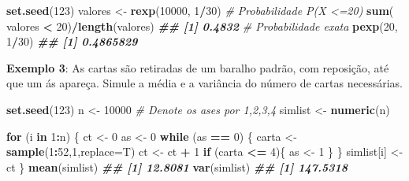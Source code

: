 \documentclass[
]{book}
\newenvironment{Shaded}{\begin{snugshade}}{\end{snugshade}}
\newcommand{\AttributeTok}[1]{\textcolor[rgb]{0.13,0.29,0.53}{#1}}
\newcommand{\CommentTok}[1]{\textcolor[rgb]{0.56,0.35,0.01}{\textit{#1}}}
\newcommand{\ControlFlowTok}[1]{\textcolor[rgb]{0.13,0.29,0.53}{\textbf{#1}}}
\newcommand{\DecValTok}[1]{\textcolor[rgb]{0.00,0.00,0.81}{#1}}
\newcommand{\DocumentationTok}[1]{\textcolor[rgb]{0.56,0.35,0.01}{\textbf{\textit{#1}}}}
\newcommand{\FunctionTok}[1]{\textcolor[rgb]{0.13,0.29,0.53}{\textbf{#1}}}
\newcommand{\NormalTok}[1]{#1}
\newcommand{\OtherTok}[1]{\textcolor[rgb]{0.56,0.35,0.01}{#1}}
\newcommand{\SpecialCharTok}[1]{\textcolor[rgb]{0.81,0.36,0.00}{\textbf{#1}}}
\begin{document}
\begin{Shaded}
\begin{Highlighting}[]
\FunctionTok{set.seed}\NormalTok{(}\DecValTok{123}\NormalTok{)}
\NormalTok{valores }\OtherTok{\textless{}{-}} \FunctionTok{rexp}\NormalTok{(}\DecValTok{10000}\NormalTok{, }\DecValTok{1}\SpecialCharTok{/}\DecValTok{30}\NormalTok{)}
\CommentTok{\# Probabilidade P(X \textless{}=20)}
\FunctionTok{sum}\NormalTok{( valores }\SpecialCharTok{\textless{}} \DecValTok{20}\NormalTok{)}\SpecialCharTok{/}\FunctionTok{length}\NormalTok{(valores)}
\DocumentationTok{\#\# [1] 0.4832}
\CommentTok{\# Probabilidade exata}
\FunctionTok{pexp}\NormalTok{(}\DecValTok{20}\NormalTok{, }\DecValTok{1}\SpecialCharTok{/}\DecValTok{30}\NormalTok{)}
\DocumentationTok{\#\# [1] 0.4865829}
\end{Highlighting}
\end{Shaded}

\textbf{Exemplo 3}: As cartas são retiradas de um baralho padrão, com
reposição, até que um ás apareça. Simule a média e a variância do número
de cartas necessárias.

\begin{Shaded}
\begin{Highlighting}[]
\FunctionTok{set.seed}\NormalTok{(}\DecValTok{123}\NormalTok{)}
\NormalTok{n }\OtherTok{\textless{}{-}} \DecValTok{10000}
\CommentTok{\# Denote os ases por 1,2,3,4 }
\NormalTok{simlist }\OtherTok{\textless{}{-}} \FunctionTok{numeric}\NormalTok{(n)}

\ControlFlowTok{for}\NormalTok{ (i }\ControlFlowTok{in} \DecValTok{1}\SpecialCharTok{:}\NormalTok{n) \{}
\NormalTok{  ct }\OtherTok{\textless{}{-}} \DecValTok{0}
\NormalTok{  as }\OtherTok{\textless{}{-}} \DecValTok{0}
  \ControlFlowTok{while}\NormalTok{ (as }\SpecialCharTok{==} \DecValTok{0}\NormalTok{) \{}
\NormalTok{    carta }\OtherTok{\textless{}{-}} \FunctionTok{sample}\NormalTok{(}\DecValTok{1}\SpecialCharTok{:}\DecValTok{52}\NormalTok{,}\DecValTok{1}\NormalTok{,}\AttributeTok{replace=}\NormalTok{T)}
\NormalTok{    ct }\OtherTok{\textless{}{-}}\NormalTok{ ct }\SpecialCharTok{+} \DecValTok{1}
    \ControlFlowTok{if}\NormalTok{ (carta }\SpecialCharTok{\textless{}=} \DecValTok{4}\NormalTok{)\{}
\NormalTok{      as }\OtherTok{\textless{}{-}} \DecValTok{1}
\NormalTok{    \}}
\NormalTok{  \}}
\NormalTok{  simlist[i] }\OtherTok{\textless{}{-}}\NormalTok{ ct}
\NormalTok{\}}
\FunctionTok{mean}\NormalTok{(simlist)}
\DocumentationTok{\#\# [1] 12.8081}
\FunctionTok{var}\NormalTok{(simlist)}
\DocumentationTok{\#\# [1] 147.5318}
\end{Highlighting}
\end{Shaded}
\end{document}
